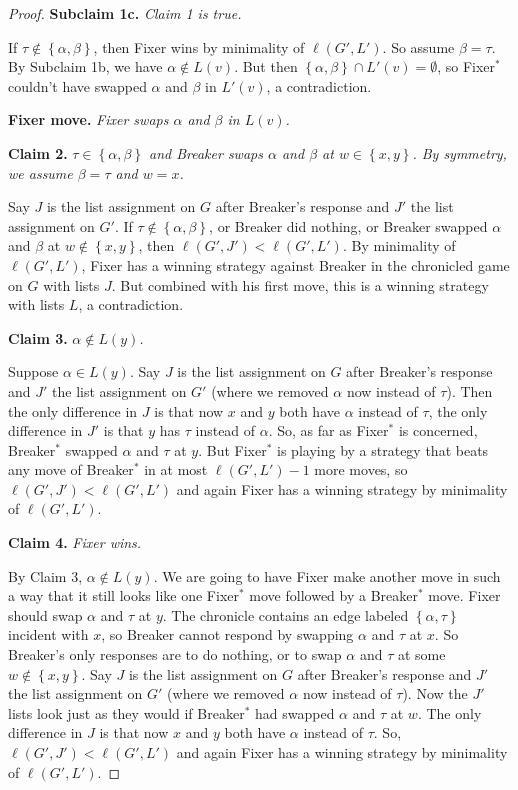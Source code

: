 \documentclass[12pt,reqno]{amsart}
\theoremstyle{plain}
\theoremstyle{definition}
\theoremstyle{remark}
\newcommand{\set}[1]{\left\{ #1 \right\}}
\begin{document}
\begin{proof}
\noindent\textbf{Subclaim 1c.  }\textit{Claim 1 is true.}

If $\tau \not \in \set{\alpha, \beta}$, then Fixer wins by minimality of $\ell(G', L')$.  So assume $\beta = \tau$. By Subclaim 1b, we have $\alpha \not \in L(v)$.  But then $\set{\alpha, \beta} \cap L'(v) = \emptyset$, so Fixer$^*$ couldn't have swapped $\alpha$ and $\beta$ in $L'(v)$, a contradiction.

\noindent\textbf{Fixer move.  }\textit{Fixer swaps $\alpha$ and $\beta$ in $L(v)$.}

\noindent\textbf{Claim 2.  }\textit{$\tau \in \set{\alpha, \beta}$ and Breaker swaps $\alpha$ and $\beta$ at $w \in \set{x, y}$.  By symmetry, we assume $\beta = \tau$ and $w = x$.}

Say $J$ is the list assignment on $G$ after Breaker's response and $J'$ the list assignment on $G'$. If $\tau \not \in \set{\alpha, \beta}$, or Breaker did nothing, or Breaker swapped $\alpha$ and $\beta$ at $w \not \in \set{x,y}$, then $\ell(G', J') < \ell(G', L')$.  By minimality of $\ell(G', L')$, Fixer has a winning strategy against Breaker in the chronicled game on $G$ with lists $J$.  But combined with his first move, this is a winning strategy with lists $L$, a contradiction.

\noindent\textbf{Claim 3.  }\textit{$\alpha \not \in L(y)$.}

Suppose $\alpha \in L(y)$. Say $J$ is the list assignment on $G$ after Breaker's response and $J'$ the list assignment on $G'$ (where we removed $\alpha$ now instead of $\tau$).  Then the only difference in $J$ is that now $x$ and $y$ both have $\alpha$ instead of $\tau$, the only difference in $J'$ is that $y$ has $\tau$ instead of $\alpha$. So, as far as Fixer$^*$ is concerned, Breaker$^*$ swapped $\alpha$ and $\tau$ at $y$.  But Fixer$^*$ is playing by a strategy that beats any move of Breaker$^*$ in at most $\ell(G', L') - 1$ more moves, so $\ell(G', J') < \ell(G', L')$ and again Fixer has a winning strategy by minimality of $\ell(G', L')$.

\noindent\textbf{Claim 4.  }\textit{Fixer wins.}

By Claim 3, $\alpha \not \in L(y)$.  We are going to have Fixer make another move in such a way that it still looks like one Fixer$^*$ move followed by a Breaker$^*$ move. Fixer should swap $\alpha$ and $\tau$ at $y$.  The chronicle contains an edge labeled $\set{\alpha, \tau}$ incident with $x$, so Breaker cannot respond by swapping $\alpha$ and $\tau$ at $x$.  So Breaker's only responses are to do nothing, or to swap $\alpha$ and $\tau$ at some $w \not \in \set{x,y}$.  Say $J$ is the list assignment on $G$ after Breaker's response and $J'$ the list assignment on $G'$ (where we removed $\alpha$ now instead of $\tau$).  Now the $J'$ lists look just as they would if Breaker$^*$ had swapped $\alpha$ and $\tau$ at $w$.  The only difference in $J$ is that now $x$ and $y$ both have $\alpha$ instead of $\tau$.  So, $\ell(G', J') < \ell(G', L')$ and again Fixer has a winning strategy by minimality of $\ell(G', L')$.
\end{proof}
\end{document}
